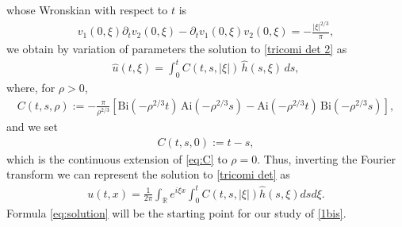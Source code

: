 \documentclass{article}
\begin{document}
whose Wronskian with respect to $t$ is
\begin{align*}
v_1(0,\xi) \partial_tv_{2}(0,\xi) - \partial_tv_1(0,\xi)v_{2}(0,\xi) = -\frac{|\xi|^{2/3}}{\pi},
\end{align*}
we obtain by variation of parameters the solution to \eqref{tricomi det 2} as
\begin{align}\label{eq:u-hat}
\widehat{u}(t,\xi)=  \int_{0}^{t} C(t,s,|\xi|)\,\widehat{h}(s,\xi)\,ds,
\end{align}
where, for \(\rho>0\),
\begin{align}\label{eq:C}
C(t,s,\rho):= -\frac{\pi}{\rho^{2/3}}\!
\left[ \mathrm{Bi}(-\rho^{2/3}t)\,\mathrm{Ai}(-\rho^{2/3}s)
- \mathrm{Ai}(-\rho^{2/3}t)\,\mathrm{Bi}(-\rho^{2/3}s)\right], 
\end{align}
and we set
\begin{align*}
 C(t,s,0):=t-s,
\end{align*}
which is the continuous extension of \eqref{eq:C} to \(\rho=0\).
Thus, inverting the Fourier transform we can represent the solution to \eqref{tricomi det} as
\begin{align}\label{eq:solution}
u(t,x) = \frac{1}{2\pi}\int_{\mathbb{R}} e^{i\xi x}
\int_{0}^{t} C(t,s,|\xi|)\widehat{h}(s,\xi)dsd\xi.
\end{align}
Formula \eqref{eq:solution} will be the starting point for our study of \eqref{1bis}.
\end{document}
